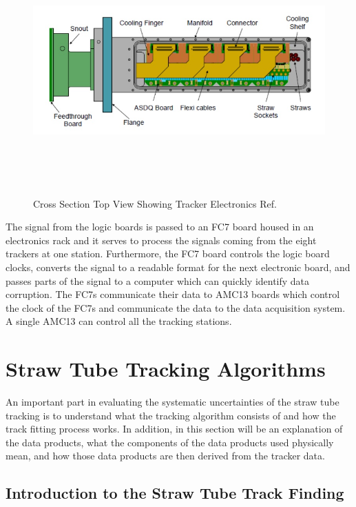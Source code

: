 \documentclass[./Thesis]{subfiles}
\begin{document}
\begin{figure}
	\centerline{\includegraphics[height=95mm]{TopViewTracker.jpeg}}
	\caption[Top View of Tracker Electronics]{ Cross Section Top View Showing Tracker Electronics  Ref.\cite{jGrange}
	}
	\label{fig:TopViewTracker}
\end{figure} 

	
	The signal from the logic boards is passed to an FC7 board housed in an electronics rack and it serves to process the signals coming from the eight trackers at one station.  Furthermore, the FC7 board controls the logic board clocks, converts the signal to a readable format for the next electronic board, and passes parts of the signal to a computer which can quickly identify data corruption. The FC7s communicate their data to AMC13 boards which control the clock of the FC7s and communicate the data to the data acquisition system.  A single AMC13 can control all the tracking stations.
	
\section{Straw Tube Tracking Algorithms}

 	An important part in evaluating the systematic uncertainties of the straw tube tracking is to understand what the tracking algorithm consists of and how the track fitting process works.  In addition, in this section will be an explanation of the data products, what the components of the data products used physically mean, and how those data products are then derived from the tracker data.
			 
\subsection{Introduction to the Straw Tube Track Finding}
\end{document}

